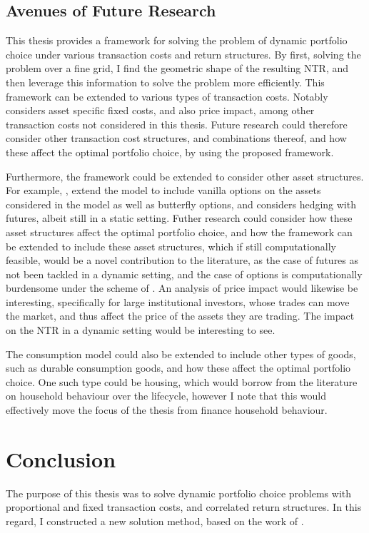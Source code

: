 \documentclass[11pt]{article}
\begin{document}
\subsection{Avenues of Future Research} \label{Subsection: Future Research}
This thesis provides a framework for solving the problem of dynamic portfolio choice under various transaction costs and return structures.
By first, solving the problem over a fine grid, I find the geometric shape of the resulting \ac{NTR}, and then leverage this information to solve the problem more efficiently.
This framework can be extended to various types of transaction costs. Notably \autocite{Dybvig2020} considers asset specific fixed costs, and also price impact,
among other transaction costs not considered in this thesis. Future research could therefore consider other transaction cost structures, and combinations thereof,
and how these affect the optimal portfolio choice, by using the proposed framework.

Furthermore, the framework could be extended to consider other asset structures.
For example, \autocite{CaiJuddXu2020}, extend the model to include vanilla options on the assets considered in the model as well as butterfly options,
and \autocite{Dybvig2020} considers hedging with futures, albeit still in a static setting.
Futher research could consider how these asset structures affect the optimal portfolio choice, and how the framework can be extended to include these asset structures,
which if still computationally feasible, would be a novel contribution to the literature, as the case of futures as not been tackled in a dynamic setting,
and the case of options is computationally burdensome under the scheme of \autocite{CaiJuddXu2020}.
An analysis of price impact would likewise be interesting, specifically for large institutional investors,
whose trades can move the market, and thus affect the price of the assets they are trading. The impact on the \ac{NTR} in a dynamic setting would be interesting to see.

The consumption model could also be extended to include other types of goods, such as durable consumption goods, and how these affect the optimal portfolio choice.
One such type could be housing, which would borrow from the literature on household behaviour over the lifecycle, however I note that this would effectively move the focus of the thesis from finance household behaviour.


\section{Conclusion} \label{Section: Conclusion}
The purpose of this thesis was to solve dynamic portfolio choice problems with proportional and fixed transaction costs, and correlated return structures.
In this regard, I constructed a new solution method, based on the work of \autocite{Scheidegger2023}.
\end{document}
